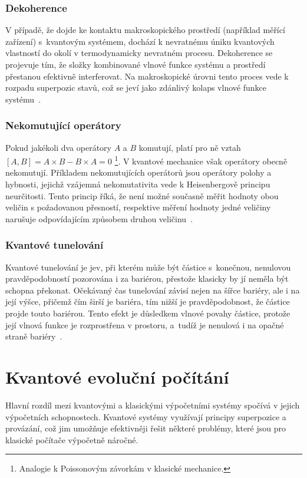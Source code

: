 \subsubsection*{Dekoherence}
V případě, že dojde ke kontaktu makroskopického prostředí (například měřící zařízení) s~kvantovým systémem, dochází k nevratnému úniku kvantových vlastností do okolí v termodynamicky nevratném procesu. 
Dekoherence se projevuje tím, že složky kombinované vlnové funkce systému a prostředí přestanou efektivně interferovat.
Na makroskopické úrovni tento proces vede k rozpadu superpozic stavů, což se jeví jako zdánlivý kolaps vlnové funkce systému~\cite{NaturalComputing}.

\subsubsection*{Nekomutující operátory}
Pokud jakékoli dva operátory $A$ a $B$ komutují, platí pro ně vztah $\left[A, B \right] = A \times B - B \times A = 0$\,\,\footnote{Analogie k Poissonovým závorkám v klasické mechanice.}. 
V kvantové mechanice však operátory obecně nekomutují. 
Příkladem nekomutujících operátorů jsou operátory polohy a hybnosti, jejichž vzájemná nekomutativita vede k Heisenbergově principu neurčitosti.
Tento princip říká, že není možné současně měřit hodnoty obou veličin s požadovanou přesností, respektive měření hodnoty jedné veličiny narušuje odpovídajícím způsobem druhou veličinu~\cite{NaturalComputing,QuantumMeasurement}.

\subsubsection*{Kvantové tunelování}
Kvantové tunelování je jev, při kterém může být částice s~konečnou, nenulovou pravděpodobností pozorována i za bariérou, přestože klasicky by jí neměla být schopna překonat. 
Očekávaný čas tunelování závisí nejen na šířce bariéry, ale i na její výšce, přičemž čím širší je bariéra, tím nižší je pravděpodobnost, že částice projde touto bariérou. 
Tento efekt je důsledkem vlnové povahy částice, protože její vlnová funkce je rozprostřena v prostoru, a~tudíž je nenulová i na opačné straně bariéry~\cite{NaturalComputing}. 

\newpage
\section{Kvantové evoluční počítání}
Hlavní rozdíl mezi kvantovými a klasickými výpočetními systémy spočívá v jejich výpočetních schopnostech.
Kvantové systémy využívají principy superpozice a provázání, což jim umožňuje efektivněji řešit některé problémy, které jsou pro klasické počítače výpočetně náročné. 

